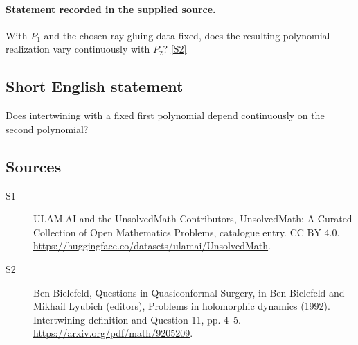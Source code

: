 \documentclass[11pt]{article}
\newcommand{\sref}[2]{\hyperlink{source:#1:#2}{[S#2]}}
\begin{document}
\paragraph{Statement recorded in the supplied source.}
With $P_1$ and the chosen ray-gluing data fixed, does the resulting polynomial realization vary continuously with $P_2$? \sref{statement}{2}
\subsection{Short English statement}
Does intertwining with a fixed first polynomial depend continuously on the second polynomial?
\subsection{Sources}
\begin{description}
\item[\hypertarget{source:statement:1}{S1}] ULAM.AI and the UnsolvedMath Contributors, UnsolvedMath: A Curated Collection of Open Mathematics Problems, catalogue entry. CC BY 4.0. \url{https://huggingface.co/datasets/ulamai/UnsolvedMath}.
\item[\hypertarget{source:statement:2}{S2}] Ben Bielefeld, Questions in Quasiconformal Surgery, in Ben Bielefeld and Mikhail Lyubich (editors), Problems in holomorphic dynamics (1992). Intertwining definition and Question 11, pp. 4–5. \url{https://arxiv.org/pdf/math/9205209}.
\end{description}
\label{end:statement}
\end{document}
